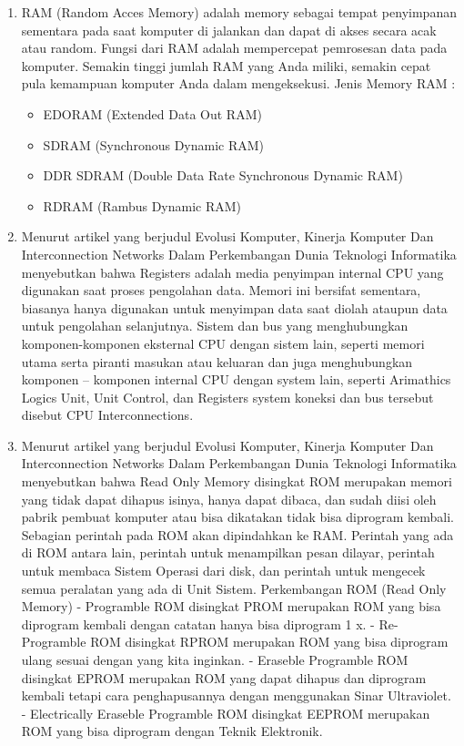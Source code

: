 \begin{enumerate}

\item RAM (Random Acces Memory) adalah memory sebagai tempat penyimpanan sementara pada saat komputer di jalankan dan dapat di akses secara acak atau random. Fungsi dari RAM adalah mempercepat pemrosesan data pada komputer. Semakin tinggi jumlah RAM yang Anda miliki, semakin cepat pula kemampuan komputer Anda dalam mengeksekusi.
Jenis Memory RAM :

\begin{itemize}

\item EDORAM (Extended Data Out RAM)  
\item SDRAM (Synchronous Dynamic RAM)  
\item DDR SDRAM (Double Data Rate Synchronous Dynamic RAM) 
\item RDRAM (Rambus Dynamic RAM)

\end{itemize}	

\item Menurut artikel yang berjudul Evolusi Komputer, Kinerja Komputer Dan Interconnection Networks Dalam Perkembangan Dunia Teknologi Informatika menyebutkan bahwa Registers adalah media penyimpan internal CPU yang digunakan saat proses pengolahan data. Memori ini bersifat sementara, biasanya hanya digunakan untuk menyimpan data saat diolah ataupun data untuk pengolahan selanjutnya. Sistem dan bus yang menghubungkan komponen-komponen eksternal CPU dengan sistem lain, seperti memori utama serta piranti masukan atau keluaran dan juga menghubungkan komponen – komponen internal CPU dengan system lain, seperti Arimathics Logics Unit, Unit Control, dan Registers system koneksi dan bus tersebut disebut CPU Interconnections. \cite{junior2016evolusi}

\item Menurut artikel yang berjudul Evolusi Komputer, Kinerja Komputer Dan Interconnection Networks Dalam Perkembangan Dunia Teknologi Informatika menyebutkan bahwa Read Only Memory disingkat ROM merupakan memori yang tidak dapat dihapus isinya, hanya dapat dibaca, dan sudah diisi oleh pabrik pembuat komputer atau bisa dikatakan tidak bisa diprogram kembali. Sebagian perintah pada ROM akan dipindahkan ke RAM. Perintah yang ada di ROM antara lain, perintah untuk menampilkan pesan dilayar, perintah untuk membaca Sistem Operasi dari disk, dan perintah untuk mengecek semua peralatan yang ada di Unit Sistem.
Perkembangan ROM (Read Only Memory)
- Programble ROM disingkat PROM merupakan ROM yang bisa diprogram kembali dengan catatan hanya bisa diprogram 1 x.
- Re-Programble ROM disingkat RPROM merupakan ROM yang bisa diprogram ulang sesuai dengan yang kita inginkan.
- Eraseble Programble ROM disingkat EPROM merupakan ROM yang dapat dihapus dan diprogram kembali tetapi cara penghapusannya dengan menggunakan Sinar Ultraviolet.
- Electrically Eraseble Programble ROM disingkat EEPROM merupakan ROM yang bisa diprogram dengan Teknik Elektronik. \cite{junior2016evolusi}


\end{enumerate}
